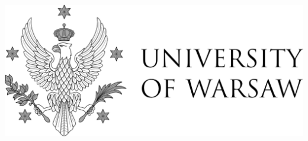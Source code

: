 \documentclass[
    aspectratio=169,
    12pt,
]{beamer}
\begin{document}
\begin{frame}
\begin{columns}
\begin{column}{.3\textwidth}
            \centering
            \includegraphics[width=\textwidth]{../figures/logo/UniWarsaw.png}            
        \end{column}
    \end{columns}
\end{frame}




\begin{frame}
\end{frame}


% 

\begin{frame}
\end{frame}
\end{document}
